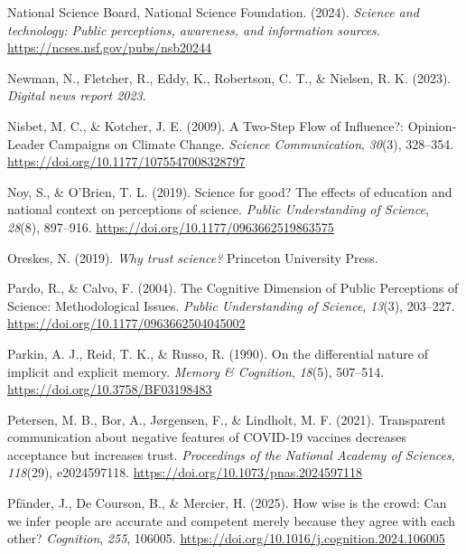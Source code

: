 \documentclass[
  jou,
  floatsintext,
  longtable,
  nolmodern,
  notxfonts,
  notimes,
  colorlinks=true,linkcolor=blue,citecolor=blue,urlcolor=blue]{apa7}
\newlength{\cslhangindent}
\newenvironment{CSLReferences}[2] %
 {\begin{list}{}{%
  \setlength{\itemindent}{0pt}
  \setlength{\leftmargin}{0pt}
  \setlength{\parsep}{0pt}
  \ifodd #1
   \setlength{\leftmargin}{\cslhangindent}
   \setlength{\itemindent}{-1\cslhangindent}
  \fi
  \setlength{\itemsep}{#2\baselineskip}}}
 {\end{list}}
\begin{document}
\begin{CSLReferences}{1}{0}
National Science Board, National Science Foundation. (2024).
\emph{Science and technology: Public perceptions, awareness, and
information sources.} \url{https://ncses.nsf.gov/pubs/nsb20244}

Newman, N., Fletcher, R., Eddy, K., Robertson, C. T., \& Nielsen, R. K.
(2023). \emph{Digital news report 2023}.

Nisbet, M. C., \& Kotcher, J. E. (2009). A Two-Step Flow of Influence?:
Opinion-Leader Campaigns on Climate Change. \emph{Science
Communication}, \emph{30}(3), 328--354.
\url{https://doi.org/10.1177/1075547008328797}

Noy, S., \& O'Brien, T. L. (2019). Science for good? The effects of
education and national context on perceptions of science. \emph{Public
Understanding of Science}, \emph{28}(8), 897--916.
\url{https://doi.org/10.1177/0963662519863575}

Oreskes, N. (2019). \emph{Why trust science?} Princeton University
Press.

Pardo, R., \& Calvo, F. (2004). The Cognitive Dimension of Public
Perceptions of Science: Methodological Issues. \emph{Public
Understanding of Science}, \emph{13}(3), 203--227.
\url{https://doi.org/10.1177/0963662504045002}

Parkin, A. J., Reid, T. K., \& Russo, R. (1990). On the differential
nature of implicit and explicit memory. \emph{Memory \& Cognition},
\emph{18}(5), 507--514. \url{https://doi.org/10.3758/BF03198483}

Petersen, M. B., Bor, A., Jørgensen, F., \& Lindholt, M. F. (2021).
Transparent communication about negative features of COVID-19 vaccines
decreases acceptance but increases trust. \emph{Proceedings of the
National Academy of Sciences}, \emph{118}(29), e2024597118.
\url{https://doi.org/10.1073/pnas.2024597118}

Pfänder, J., De Courson, B., \& Mercier, H. (2025). How wise is the
crowd: Can we infer people are accurate and competent merely because
they agree with each other? \emph{Cognition}, \emph{255}, 106005.
\url{https://doi.org/10.1016/j.cognition.2024.106005}


\end{CSLReferences}
\end{document}
